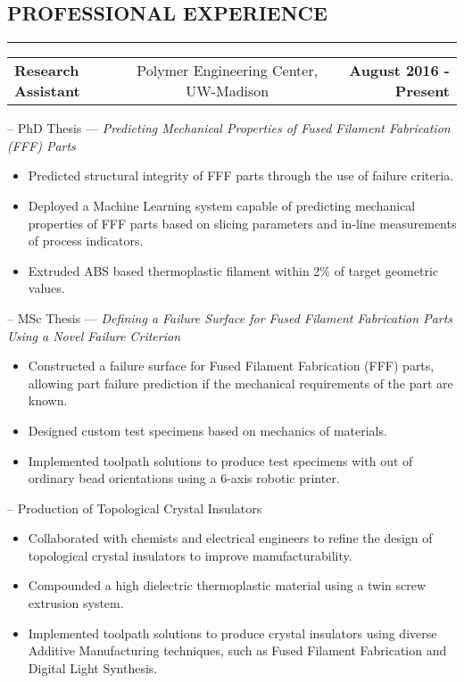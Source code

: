 \documentclass[11pt,letterpaper]{article}
\makeatletter
\newcommand{\headerrow}[3]
{\vspace{0.4em}
\noindent
\begin{tabular*}{\textwidth}{l @{\extracolsep{\fill}} cr}
	\textbf{#1} & %
	#2 &		  %
	\textbf{#3}\\ %
\end{tabular*}}
\makeatother
\begin{document}
\subsection*{PROFESSIONAL EXPERIENCE}
	\vspace{-0.5em}
	\hrule

	\headerrow
		{Research Assistant}
		{Polymer Engineering Center, UW-Madison}
		{August 2016 - Present}		

		\noindent -- PhD Thesis --- \emph{Predicting Mechanical Properties of Fused Filament Fabrication (FFF) Parts}
		\begin{itemize}
			\item Predicted structural integrity of FFF parts through the use of failure criteria.
			\item Deployed a Machine Learning system capable of predicting mechanical properties of FFF parts based on slicing parameters and in-line measurements of process indicators.
			\item Extruded ABS based thermoplastic filament within 2\% of target geometric values. 
		\end{itemize}
		
		\noindent -- MSc Thesis --- \emph{Defining a Failure Surface for Fused Filament Fabrication Parts Using a Novel Failure Criterion}
		\begin{itemize}
			\item Constructed a failure surface for Fused Filament Fabrication (FFF) parts, allowing part failure prediction if the mechanical requirements of the part are known.
			\item Designed custom test specimens based on mechanics of materials.
			\item Implemented toolpath solutions to produce test specimens with out of ordinary bead orientations using a 6-axis robotic printer.
		\end{itemize}
		
		\noindent -- Production of Topological Crystal Insulators
		
		\begin{itemize}
			\item Collaborated with chemists and electrical engineers to refine the design of topological crystal insulators to improve manufacturability.
			\item Compounded a high dielectric thermoplastic material using a twin screw extrusion system.
			\item Implemented toolpath solutions to produce crystal insulators using diverse Additive Manufacturing techniques, such as Fused Filament Fabrication and Digital Light Synthesis.  
		\end{itemize}
				
\end{document}
